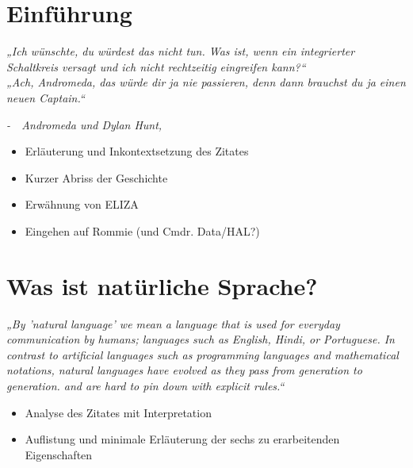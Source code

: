 \documentclass[12pt,twoside]{article}
\theoremstyle{plain}
\theoremstyle{definition}
\theoremstyle{remark}
\begin{document}
\setcounter{tocdepth}{2} 					%
\tableofcontents
{}
\clearpage



\section{Einführung}
\label{sec:intro}
	\textit{„Ich wünschte, du würdest das nicht tun.
	Was ist, wenn ein integrierter Schaltkreis versagt und ich nicht rechtzeitig eingreifen kann?“\\
	„Ach, Andromeda, das würde dir ja nie passieren, denn dann brauchst du ja einen neuen Captain.“}
	\begin{flushright}
		\textit{-~~Andromeda und Dylan Hunt, \cite{ADA101}}
	\end{flushright}
	\begin{itemize}
		\item Erläuterung und Inkontextsetzung des Zitates
	    \item Kurzer Abriss der Geschichte
	    \item Erwähnung von ELIZA
	    \item Eingehen auf Rommie (und Cmdr. Data/HAL?)
	\end{itemize}

\section{Was ist natürliche Sprache?}
\label{sec:def_lang}
\textit{„By 'natural language' we mean a language that is used for everyday communication by humans; languages such as English, Hindi, or Portuguese.
        In contrast to artificial languages such as programming languages and mathematical notations, natural languages have evolved as they pass from generation to generation.
        and are hard to pin down with explicit rules.“} \cite{Bird2009}
\begin{itemize}
    \item Analyse des Zitates mit Interpretation
    \item Auflistung und minimale Erläuterung der sechs zu erarbeitenden Eigenschaften
\end{itemize}
\end{document}

